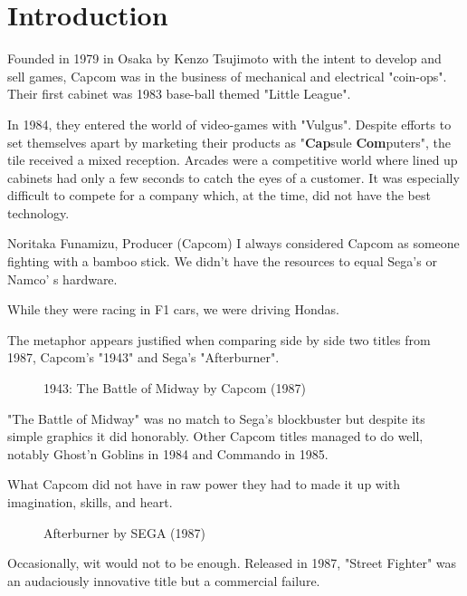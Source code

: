 \chapter{Introduction} 

Founded in 1979 in Osaka by Kenzo Tsujimoto with the intent to develop and sell games, Capcom was in the business of mechanical and electrical "coin-ops". Their first cabinet was 1983 base-ball themed "Little League".

In 1984, they entered the world of video-games with "Vulgus". Despite efforts to set themselves apart by marketing their products as "\textbf{Cap}sule \textbf{Com}puters", the tile received a mixed reception. Arcades were a competitive world where lined up cabinets had only a few seconds to catch the eyes of a customer. It was especially difficult to compete for a company which, at the time, did not have the best technology.

\begin{q}{Noritaka Funamizu, Producer (Capcom)}
I always considered Capcom as someone fighting with a bamboo stick. We didn't have the resources to equal Sega's or Namco'
s hardware. 

While they were racing in F1 cars, we were driving Hondas.
\end{q}

The metaphor appears justified when comparing side by side two titles from 1987, Capcom's "1943" and Sega's "Afterburner".

\begin{figure}[H]
\caption*{1943: The Battle of Midway by Capcom (1987)}
\end{figure}




"The Battle of Midway" was no match to Sega's blockbuster but despite its simple graphics it did honorably. Other Capcom titles managed to do well, notably Ghost’n Goblins in 1984 and Commando in 1985.

What Capcom did not have in raw power they had to made it up with imagination, skills, and heart. 

\begin{figure}[H]
\caption*{Afterburner by SEGA (1987)}
\end{figure}

Occasionally, wit would not to be enough. Released in 1987,  "Street Fighter" was an audaciously innovative title but a commercial failure.

